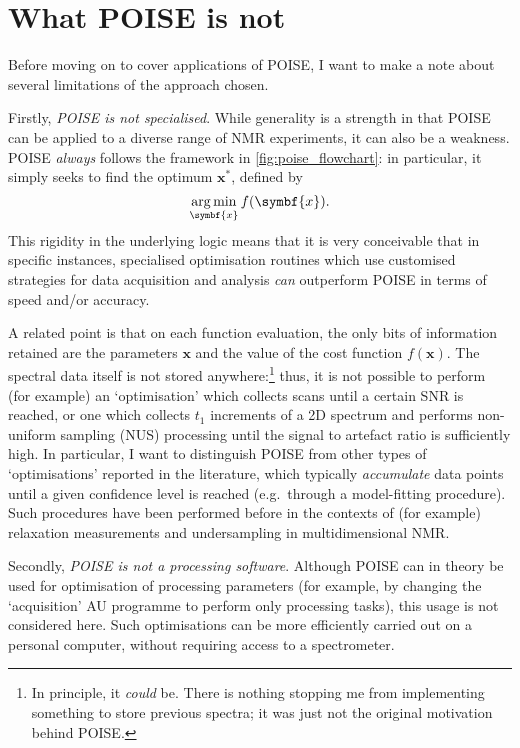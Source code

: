 \section{What POISE is not}
\label{sec:poise__notpoise}

Before moving on to cover applications of POISE, I want to make a note about several limitations of the approach chosen. 

Firstly, \textit{POISE is not specialised}.
While generality is a strength in that POISE can be applied to a diverse range of NMR experiments, it can also be a weakness.
POISE \textit{always} follows the framework in \cref{fig:poise_flowchart}: in particular, it simply seeks to find the optimum $\symbf{x}^*$, defined by
\begin{equation}
    \label{eq:poise_argmin}
    \underset{\symbf{x}}{\argmin}\, f(\symbf{x}).
\end{equation}
This rigidity in the underlying logic means that it is very conceivable that in specific instances, specialised optimisation routines which use customised strategies for data acquisition and analysis \textit{can} outperform POISE in terms of speed and/or accuracy.

A related point is that on each function evaluation, the only bits of information retained are the parameters $\symbf{x}$ and the value of the cost function $f(\symbf{x})$.
The spectral data itself is not stored anywhere:\footnote{In principle, it \textit{could} be. There is nothing stopping me from implementing something to store previous spectra; it was just not the original motivation behind POISE.} thus, it is not possible to perform (for example) an `optimisation' which collects scans until a certain SNR is reached, or one which collects $t_1$ increments of a 2D spectrum and performs non-uniform sampling (NUS) processing until the signal to artefact ratio is sufficiently high.
In particular, I want to distinguish POISE from other types of `optimisations' reported in the literature, which typically \textit{accumulate} data points until a given confidence level is reached (e.g.\ through a model-fitting procedure).
Such procedures have been performed before in the contexts of (for example) relaxation measurements\autocite{Song2018JMR,Tang2019SR} and undersampling in multidimensional NMR\autocite{Eghbalnia2005JACS,Hansen2016ACIE,BrukerSmartDriveNMR}.

Secondly, \textit{POISE is not a processing software}.
Although POISE can in theory be used for optimisation of processing parameters (for example, by changing the `acquisition' AU programme to perform only processing tasks), this usage is not considered here.
Such optimisations can be more efficiently carried out on a personal computer, without requiring access to a spectrometer.

